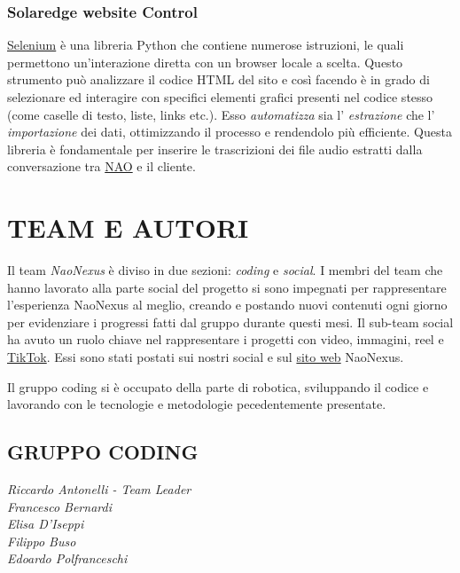 \documentclass{optica-article}
\begin{document}
\subsubsection{Solaredge website Control}\label{sec:solaredge_website_control}
\href{https://www.selenium.dev/documentation/}{Selenium} è una libreria Python che contiene numerose istruzioni, le quali permettono un'interazione diretta con un browser locale a scelta. Questo strumento può analizzare il codice HTML del sito e così facendo è in grado di selezionare ed interagire con specifici elementi grafici presenti nel codice stesso (come caselle di testo, liste, links etc.). Esso \emph{automatizza} sia l' \emph{estrazione} che l' \emph{importazione} dei dati, ottimizzando il processo e rendendolo più efficiente. Questa libreria è fondamentale per inserire le trascrizioni dei file audio estratti dalla conversazione tra \hyperref[sec:solaredge_nao]{NAO} e il cliente.

\newpage

\section{TEAM E AUTORI}\label{sec:team_authors}
Il team \emph{NaoNexus} è diviso in due sezioni: \emph{coding} e \emph{social}. I membri del team che hanno lavorato alla parte social del progetto si sono impegnati per rappresentare l'esperienza NaoNexus al meglio, creando e postando nuovi contenuti ogni giorno per evidenziare i progressi fatti dal gruppo durante questi mesi. Il sub-team social ha avuto un ruolo chiave nel rappresentare i progetti con video, immagini, reel e \href{https://www.tiktok.com/@naonexus}{TikTok}. Essi sono stati postati sui nostri social e sul \href{https://www.naonexus.altervista.org}{sito web} NaoNexus.

\bigskip
\noindent
Il gruppo coding si è occupato della parte di robotica, sviluppando il codice e lavorando con le tecnologie e metodologie pecedentemente presentate.\\

\subsection{GRUPPO CODING}

\noindent\emph{Riccardo Antonelli - Team Leader}\\
\emph{Francesco Bernardi}\\
\emph{Elisa D'Iseppi}\\
\emph{Filippo Buso}\\
\emph{Edoardo Polfranceschi}\\
\end{document}
